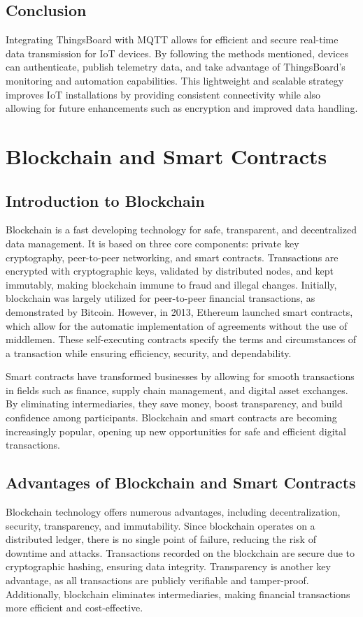 \documentclass[a4paper,12pt]{report}
\begin{document}
 \section{Conclusion}
 Integrating ThingsBoard with MQTT allows for efficient and secure real-time data transmission for IoT devices. By following the methods mentioned, devices can authenticate, publish telemetry data, and take advantage of ThingsBoard's monitoring and automation capabilities. This lightweight and scalable strategy improves IoT installations by providing consistent connectivity while also allowing for future enhancements such as encryption and improved data handling.

\chapter{Blockchain and Smart Contracts}
\section{Introduction to Blockchain}
Blockchain is a fast developing technology for safe, transparent, and decentralized data management. It is based on three core components: private key cryptography, peer-to-peer networking, and smart contracts\cite{swan2016blockchain}. Transactions are encrypted with cryptographic keys, validated by distributed nodes, and kept immutably, making blockchain immune to fraud and illegal changes\cite{tern2021survey}.
Initially, blockchain was largely utilized for peer-to-peer financial transactions, as demonstrated by Bitcoin.  However, in 2013, Ethereum launched smart contracts, which allow for the automatic implementation of agreements without the use of middlemen\cite{yuan2018shadoweth}.  These self-executing contracts specify the terms and circumstances of a transaction while ensuring efficiency, security, and dependability\cite{falazi2020smart}.

 Smart contracts have transformed businesses by allowing for smooth transactions in fields such as finance, supply chain management, and digital asset exchanges.  By eliminating intermediaries, they save money, boost transparency, and build confidence among participants\cite{johari2021smart}.  Blockchain and smart contracts are becoming increasingly popular, opening up new opportunities for safe and efficient digital transactions.



 \section{Advantages of Blockchain and Smart Contracts}
 Blockchain technology offers numerous advantages, including decentralization, security, transparency, and immutability. Since blockchain operates on a distributed ledger, there is no single point of failure, reducing the risk of downtime and attacks. Transactions recorded on the blockchain are secure due to cryptographic hashing, ensuring data integrity. Transparency is another key advantage, as all transactions are publicly verifiable and tamper-proof. Additionally, blockchain eliminates intermediaries, making financial transactions more efficient and cost-effective.
 
\end{document}
